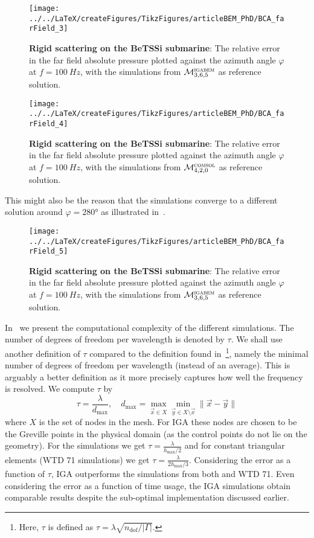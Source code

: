 \begin{figure}
	\centering
	\texttt{[image: ../../LaTeX/createFigures/TikzFigures/articleBEM\_PhD/BCA\_farField\_3]}
	\caption{\textbf{Rigid scattering on the BeTSSi submarine}: The relative error in the far field absolute pressure plotted against the azimuth angle $\varphi$ at $f = \SI{100}{Hz}$, with the simulations from ${\cal M}_{3,6,5}^{\textsc{igabem}}$ as reference solution.}
	\label{Fig3:error_BI_100_IGA}
\end{figure}
\begin{figure}
	\centering
	\texttt{[image: ../../LaTeX/createFigures/TikzFigures/articleBEM\_PhD/BCA\_farField\_4]}
	\caption{\textbf{Rigid scattering on the BeTSSi submarine}: The relative error in the far field absolute pressure plotted against the azimuth angle $\varphi$ at $f = \SI{100}{Hz}$, with the simulations from ${\cal M}_{4,2,0}^{\textsc{comsol}}$ as reference solution.}
	\label{Fig3:error_BI_100_COMSOL}
\end{figure}
This might also be the reason that the \COMSOL simulations converge to a different solution around $\varphi=\ang{280}$ as illustrated in~.
\begin{figure}
	\centering
	\texttt{[image: ../../LaTeX/createFigures/TikzFigures/articleBEM\_PhD/BCA\_farField\_5]}
	\caption{\textbf{Rigid scattering on the BeTSSi submarine}: The relative error in the far field absolute pressure plotted against the azimuth angle $\varphi$ at $f = \SI{100}{Hz}$, with the simulations from ${\cal M}_{3,6,5}^{\textsc{igabem}}$ as reference solution.}
	\label{Fig3:error_BI_100_COMSOL_IGA}
\end{figure}
In~ we present the computational complexity of the different simulations. The number of degrees of freedom per wavelength is denoted by $\tau$. We shall use another definition of $\tau$ compared to the definition found in~\cite[p. 767]{Peake2015eib}\footnote{Here, $\tau$ is defined as $\tau = \lambda\sqrt{n_{\mathrm{dof}}/|\Gamma|}$.}, namely the minimal number of degrees of freedom per wavelength (instead of an average). This is arguably a better definition as it more precisely captures how well the frequency is resolved. We compute $\tau$ by
\begin{equation*}
	\tau=\frac{\lambda}{d_{\mathrm{max}}},\quad d_{\mathrm{max}} = \max_{\vec{x}\in X}\min_{\vec{y}\in X\setminus\vec{x}}\|\vec{x}-\vec{y}\|
\end{equation*}
where $X$ is the set of nodes in the mesh. For IGA these nodes are chosen to be the Greville points in the physical domain (as the control points do not lie on the geometry). For the \COMSOL simulations we get $\tau=\frac{\lambda}{h_{\mathrm{max}}/2}$ and for constant triangular elements (WTD 71 simulations) we get ${\tau=\frac{\lambda}{2h_{\mathrm{max}}/3}}$. Considering the error as a function of $\tau$, IGA outperforms the simulations from both \COMSOL and WTD 71. Even considering the error as a function of time usage, the IGA simulations obtain comparable results despite the sub-optimal implementation discussed earlier.
